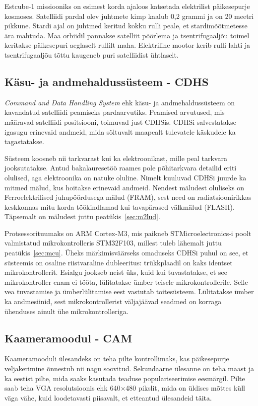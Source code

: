 \documentclass[12pt,a4paper]{article}
\begin{document}
Estcube-1 missiooniks on esimest korda ajaloos katsetada elektrilist
päikesepurje kosmoses. Satelliidi pardal olev juhtmete kimp kaalub 0,2 grammi ja
on 20 meetri pikkune. Stardi ajal on juhtmed keritud kokku rulli peale, et
stardimõõtmetesse ära mahtuda. Maa orbiidil pannakse satelliit pöörlema ja
tsentrifugaaljõu toimel keritakse päikesepuri aeglaselt rullilt maha.
Elektriline mootor kerib rulli lahti ja tsentrifugaaljõu tõttu kaugeneb puri
satelliidist ühtlaselt.
\subsection{Käsu- ja andmehaldussüsteem - CDHS}
\textit{Command and Data Handling System} ehk käsu- ja andmehaldussüsteem on
kavandatud satelliidi peamiseks pardaarvutiks. Peamised arvutused, mis määravad
satelliidi positsiooni, toimuvad just CDHSis. CDHSi salvestatakse igasugu
erinevaid andmeid, mida sõltuvalt maapealt tulevatele käskudele ka tagastatakse.

Süsteem koosneb nii tarkvarast kui ka elektroonikast, mille peal tarkvara
jooksutatakse. Antud bakalauresetöö raames pole põhitarkvara detailid eriti
olulised, aga elektroonika on natuke oluline. Nimelt kuuluvad CDHSi juurde ka
mitmed mälud, kus hoitakse erinevaid andmeid. Nendest mäludest oluliseks on
Ferroelektrilised juhupöördusega mälud (FRAM), sest need on radiatsioonirikkas
keskkonnas mitu korda töökindlamad kui tavapärased välkmälud (FLASH). Täpsemalt
on mäludest juttu peatükis~\ref{sec:m2lud}.

Protsessorituumaks on ARM Cortex-M3, mis paikneb STMicroelectronics-i poolt
valmistatud mikrokontrolleris STM32F103, millest tuleb lähemalt juttu
peatükis~\ref{sec:mcu}. Üheks märkimisväärseks omaduseks CDHSi puhul on see, et
süsteemis on osaline riistvaraline dubleeritus: trükkplaadil on kaks identset
mikrokontrollerit. Esialgu jookseb neist üks, kuid kui tuvastatakse, et see
mikrokontroller enam ei tööta, lülitatakse ümber teisele mikrokontrollerile.
Selle vea tuvastamise ja ümberlülitamise eest vastutab toitesüsteem. Lülitatakse
ümber ka andmesiinid, sest mikrokontrollerist väljajäävad seadmed on korraga
ühenduses ainult ühe mikrokontrolleriga.

\subsection{Kaameramoodul - CAM}
Kaameramooduli ülesandeks on teha pilte kontrollimaks, kas päikesepurje
veljakerimine õnnestub nii nagu soovitud. Sekundaarne ülesanne on teha maast ja
ka eestist pilte, mida saaks kasutada teaduse populariseerimise eesmärgil.
Pilte saab teha VGA resolutsioonis ehk 640\(\times\)480 pikslit, mida on üldises
mõttes küll väga vähe, kuid loodetavasti piisavalt, et etteantud ülesandeid
täita.
\end{document}
